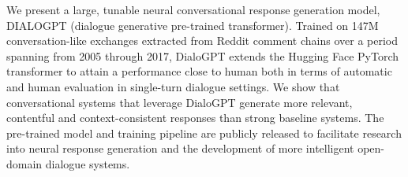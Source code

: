 We present a large, tunable neural conversational response generation model, DIALOGPT (dialogue generative pre-trained transformer). Trained on 147M conversation-like exchanges extracted from Reddit comment chains over a period spanning from 2005 through 2017, DialoGPT extends the Hugging Face PyTorch transformer to attain a performance close to human both in terms of automatic and human evaluation in single-turn dialogue settings. We show that conversational systems that leverage DialoGPT generate more relevant, contentful and context-consistent responses than strong baseline systems. The pre-trained model and training pipeline are publicly released to facilitate research into neural response generation and the development of more intelligent open-domain dialogue systems.
